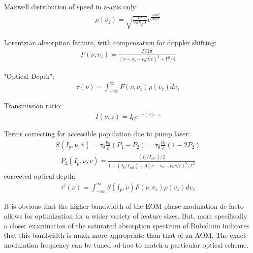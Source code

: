 Maxwell distribution of speed in z-axis only:
\begin{gather}
  \rho(v_z) = \sqrt{\frac{m}{2\pi k_B T}} e^{\frac{-m v_z^2}{2k_B T}}
\end{gather}

Lorentzian absorption feature, with compensation for doppler shifting:
\begin{gather}
  F(\nu, v_z) = \frac{\Gamma / 2 \pi}{(\nu - \nu_0 + \nu_0 v / c)^2 +
  \Gamma^2 / 4}
\end{gather}

"Optical Depth":
\begin{gather}
  \tau(\nu) = \int_{-\infty}^\infty F(\nu, v_z) \rho(v_z) dv_z
\end{gather}

Transmission ratio:
\begin{gather}
  I(\nu, z) = I_0 e^{-\tau(\nu)\cdot z}
\end{gather}

Terms correcting for accessible population due to pump laser:
\begin{gather}
  S(I_p, \nu, v) = \tau_0 \frac{\nu_0}{c} (P_1 - P_2) =
    \tau_0 \frac{\nu_0}{c} (1 - 2 P_2)
\end{gather}
\begin{gather}
  P_2(I_p, \nu, v) = \frac{ (I_p/I_{sat})/2}{1 + (I_p/I_{sat}) +
    4(\nu - \nu_0 - \nu_0 v/c)^2/\Gamma^2}
\end{gather}
corrected optical depth:
\begin{gather}\label{eq:corr_opt_depth}
  \tau'(\nu) = \int_{-\infty}^\infty S(I_p, \nu) F(\nu, v_z) \rho(v_z) dv_z
\end{gather}

It is obvious that the higher bandwidth of the EOM phase modulation de-facto
allows for optimization for a wider variety of feature sizes. But, more
specifically a closer examination of the saturated absorption spectrum of
Rubidium indicates that this bandwidth is much more appropriate than that of an
AOM. The exact modulation frequency can be tuned ad-hoc to match a particular
optical scheme.

